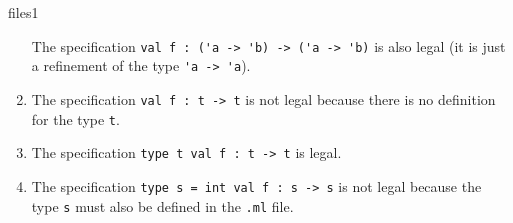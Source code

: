 \begin{exercise}{files1}
\begin{answer}
\begin{enumerate}
The specification \hbox{\lstinline+val f : ('a -> 'b) -> ('a -> 'b)+}
is also legal (it is just a refinement of the type
\hbox{\lstinline+'a -> 'a+}).

\item 

The specification \hbox{\lstinline+val f : t -> t+} is not legal
because there is no definition for the type \hbox{\lstinline+t+}.

\item

The specification \hbox{\lstinline+type t val f : t -> t+} is legal.

\item

The specification \hbox{\lstinline+type s = int val f : s -> s+} is
not legal because the type \hbox{\lstinline+s+} must also be defined
in the \hbox{\lstinline+.ml+} file.
\end{enumerate}
\fi\end{answer}
\end{exercise}

